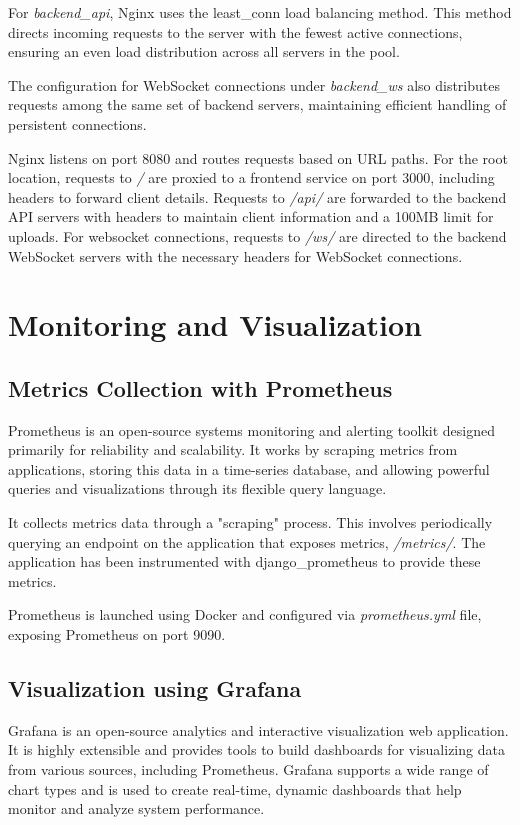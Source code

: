 For \textit{backend\_api}, Nginx uses the least\_conn load balancing method. This method directs incoming requests to the 
server with the fewest active connections, ensuring an even load distribution across all servers in the pool.

The configuration for WebSocket connections under \textit{backend\_ws} also distributes requests among the same set of
backend servers, maintaining efficient handling of persistent connections.

Nginx listens on port 8080 and routes requests based on URL paths.
For the root location, requests to \textit{/} are proxied to a frontend service on port 3000, including 
headers to forward client details. Requests to \textit{/api/} are forwarded to the backend API servers with headers 
to maintain client information and a 100MB limit for uploads.
For websocket connections, requests to \textit{/ws/} are directed to the backend WebSocket servers with the necessary 
headers for WebSocket connections.


\section{Monitoring and Visualization}
\subsection{Metrics Collection with Prometheus}
Prometheus \cite{rfc56} is an open-source systems monitoring and alerting toolkit designed primarily for reliability and scalability.
It works by scraping metrics from applications, storing this data in a time-series database, and allowing 
powerful queries and visualizations through its flexible query language.

It collects metrics data through a "scraping" process. This involves periodically querying an endpoint on 
the application that exposes metrics, \textit{/metrics/}. The application has been instrumented with 
django\_prometheus to provide these metrics.

Prometheus is launched using Docker and configured via \textit{prometheus.yml} file, exposing Prometheus 
on port 9090.


\subsection{Visualization using Grafana}
Grafana \cite{rfc55} is an open-source analytics and interactive visualization web application. It is highly extensible and 
provides tools to build dashboards for visualizing data from various sources, including Prometheus. Grafana supports 
a wide range of chart types and is used to create real-time, dynamic dashboards that help monitor and analyze system 
performance.

